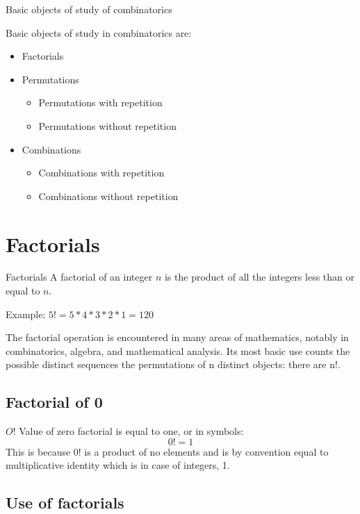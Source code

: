 \documentclass[11pt]{beamer}
\begin{document}
	\begin{frame}{Basic objects of study of combinatorics} 
		
		Basic objects of study in combinatorics are: 
		\begin{itemize}
			\pause
			\item Factorials
			\pause 
			\item Permutations 
			\begin{itemize}
				\pause
				\item  Permutations with repetition 
				\item  Permutations without repetition
			\end{itemize}
			\pause
			\item Combinations 
			\begin{itemize}
				\pause
				\item Combinations with repetition 
				\item Combinations without repetition 
			\end{itemize}
		\end{itemize}
	\end{frame}

	\section{Factorials}
	\begin{frame}{Factorials}
		A factorial of an \alert{integer} $n$ is the \alert{product} of all the integers less than or equal to $n$. 
		
		\begin{exampleblock}{Example:}
			$5! = 5 * 4 * 3 * 2 * 1 = 120$
		\end{exampleblock}
		
		The factorial operation is encountered in many areas of mathematics, notably in combinatorics, algebra, and mathematical analysis. Its most basic use counts the possible distinct sequences \alert{the permutations}  of n distinct objects: there are n!. 
	\end{frame}

	\subsection{Factorial of 0}
	\begin{frame}{$O!$}
		Value of zero factorial is equal to one, or in symbols: $$0! = 1$$ This is because 0! is a product of no elements and is by convention equal to multiplicative identity which is in case of integers, 1.
		\subsection{Use of factorials}
		
	\end{frame}
\end{document}
